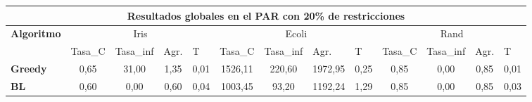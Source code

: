 \documentclass[12pt, spanish]{article}
\begin{document}
\begin{table}[H]
\small
\begin{adjustwidth}{-1cm}{-1cm}%


\begin{tabular}{|c|c|c|c|c|c|c|c|c|c|c|c|c|}
\hline
\multicolumn{13}{|c|}{\textbf{Resultados globales en el PAR con 20\% de restricciones}}                                                                                                                                                                                                                                                                                                              \\ \hline
\multirow{2}{*}{\textbf{Algoritmo}}   & \multicolumn{4}{c|}{Iris}                                                                                          & \multicolumn{4}{c|}{Ecoli}                                                                                         & \multicolumn{4}{c|}{Rand}                                                                                          \\ \cline{2-13} 
                                      & \multicolumn{1}{l|}{Tasa\_C} & \multicolumn{1}{l|}{Tasa\_inf} & \multicolumn{1}{l|}{Agr.} & \multicolumn{1}{l|}{T} & \multicolumn{1}{l|}{Tasa\_C} & \multicolumn{1}{l|}{Tasa\_inf} & \multicolumn{1}{l|}{Agr.} & \multicolumn{1}{l|}{T} & \multicolumn{1}{l|}{Tasa\_C} & \multicolumn{1}{l|}{Tasa\_inf} & \multicolumn{1}{l|}{Agr.} & \multicolumn{1}{l|}{T} \\ \hline
\multicolumn{1}{|l|}{\textbf{Greedy}} & 0,65                         & 31,00                          & 1,35                      & 0,01                   & 1526,11                      & 220,60                         & 1972,95                   & 0,25                   & 0,85                         & 0,00                           & 0,85                      & 0,01                   \\ \hline
\multicolumn{1}{|l|}{\textbf{BL}}     & 0,60                         & 0,00                           & 0,60                      & 0,04                   & 1003,45                      & 93,20                          & 1192,24                   & 1,29                   & 0,85                         & 0,00                           & 0,85                      & 0,03                   \\ \hline
\end{tabular}

\end{adjustwidth}
\end{table}
\end{document}
